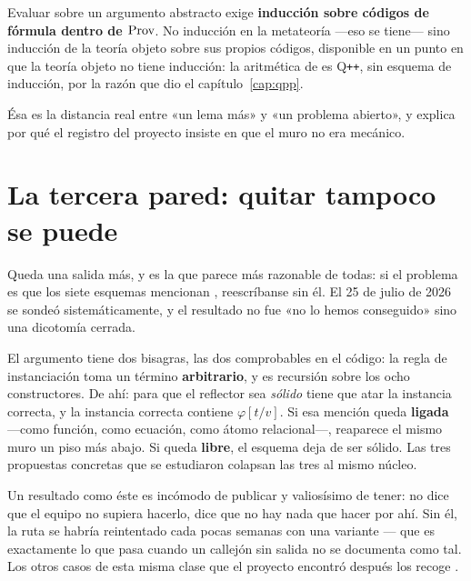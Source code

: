\begin{muro}
Evaluar  sobre un argumento abstracto exige \textbf{inducción sobre códigos de
fórmula dentro de $\operatorname{Prov}$}. No inducción en la metateoría —eso se tiene— sino inducción de la
teoría objeto sobre sus propios códigos, disponible en un punto en que la teoría objeto no tiene
inducción: la aritmética de  es Q\texttt{++}, sin esquema de
inducción, por la razón que dio el capítulo~\ref{cap:qpp}.

Ésa es la distancia real entre «un lema más» y «un problema abierto», y explica por qué el registro
del proyecto insiste en que el muro no era mecánico.
\end{muro}

\section{La tercera pared: quitar \texorpdfstring{}{substfc} tampoco se puede}

Queda una salida más, y es la que parece más razonable de todas: si el problema es que los siete
esquemas mencionan , reescríbanse sin él. El 25 de julio de 2026 se sondeó
sistemáticamente, y el resultado no fue «no lo hemos conseguido» sino una dicotomía cerrada.

El argumento tiene dos bisagras, las dos comprobables en el código: la regla de instanciación toma
un término \textbf{arbitrario}, y  es recursión sobre los ocho constructores.
De ahí: para que el reflector sea \emph{sólido} tiene que atar la instancia correcta, y la instancia
correcta contiene $\varphi[t/v]$. Si esa mención queda \textbf{ligada} —como función, como ecuación,
como átomo relacional—, reaparece el mismo muro un piso más abajo. Si queda \textbf{libre}, el
esquema deja de ser sólido. Las tres propuestas concretas que se estudiaron colapsan las tres al
mismo núcleo.

\begin{leccion}
Un resultado como éste es incómodo de publicar y valiosísimo de tener: no dice que el equipo no
supiera hacerlo, dice que no hay nada que hacer por ahí. Sin él, la ruta se habría reintentado cada
pocas semanas con una variante — que es exactamente lo que pasa cuando un callejón sin salida no se
documenta como tal. Los otros casos de esta misma clase que el proyecto encontró después los
recoge .
\end{leccion}


